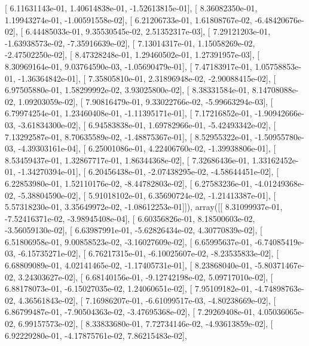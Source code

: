 \documentclass{article}
\begin{document}
       [  6.11631143e-01,   1.40614838e-01,  -1.52613815e-01],
       [  8.36082350e-01,   1.19943274e-01,  -1.00591558e-02],
       [  6.21206733e-01,   1.61808767e-02,  -6.48420676e-02],
       [  6.44485033e-01,   9.35530545e-02,   2.51352317e-03],
       [  7.29121203e-01,  -1.63938573e-02,  -7.35916639e-02],
       [  7.13014317e-01,   1.15058269e-02,  -2.47502250e-02],
       [  8.47328248e-01,   1.29460502e-01,   1.27391957e-03],
       [  8.30969164e-01,   9.03764590e-03,  -1.05690479e-01],
       [  7.47183917e-01,   1.05758853e-01,  -1.36364842e-01],
       [  7.35805810e-01,   2.31896948e-02,  -2.90088415e-02],
       [  6.97505880e-01,   1.58299992e-02,   3.93025800e-02],
       [  8.38331584e-01,   8.14708088e-02,   1.09203059e-02],
       [  7.90816479e-01,   9.33022766e-02,  -5.99663294e-03],
       [  6.79974254e-01,   1.23460408e-01,  -1.11395171e-01],
       [  7.17216852e-01,  -1.90942666e-03,  -3.61834300e-02],
       [  6.94583838e-01,   1.69782966e-01,  -5.42493342e-02],
       [  7.13292587e-01,   8.70635589e-02,  -1.48875367e-01],
       [  8.52955322e-01,  -1.50955780e-03,  -4.39303161e-04],
       [  6.25001086e-01,   4.22406760e-02,  -1.39938806e-01],
       [  8.53459437e-01,   1.32867717e-01,   1.86344368e-02],
       [  7.32686436e-01,   1.33162452e-01,  -1.34270394e-01],
       [  6.20456438e-01,  -2.07438295e-02,  -4.58644451e-02],
       [  6.22853980e-01,   1.52110176e-02,  -8.44782803e-02],
       [  6.27583236e-01,  -4.01249368e-02,  -5.38804590e-02],
       [  5.91018102e-01,   6.35690724e-02,  -1.21413387e-01],
       [  5.57318230e-01,   3.35649972e-02,  -1.08612253e-01]]), array([[  8.31099937e-01,  -7.52416371e-02,  -3.98945408e-04],
       [  6.60356826e-01,   8.18500603e-02,  -3.56059130e-02],
       [  6.63987991e-01,  -5.62826434e-02,   4.30770839e-02],
       [  6.51806958e-01,   9.00858523e-02,  -3.16027609e-02],
       [  6.65995637e-01,  -6.74085419e-03,  -6.15735271e-02],
       [  6.76217315e-01,  -6.10025607e-02,  -8.23535833e-02],
       [  6.68809089e-01,   4.02141465e-02,  -1.17405731e-01],
       [  8.23868040e-01,  -5.80371467e-02,   3.24303627e-02],
       [  6.68140156e-01,  -9.12742198e-02,   5.09717010e-02],
       [  6.88178073e-01,  -6.15027035e-02,   1.24060651e-02],
       [  7.95109182e-01,  -4.74898763e-02,   4.36561843e-02],
       [  7.16986207e-01,  -6.61099517e-03,  -4.80238669e-02],
       [  6.86799487e-01,  -7.90504363e-02,  -3.47695368e-02],
       [  7.29269408e-01,   4.05036065e-02,   6.99157573e-02],
       [  8.33833680e-01,   7.72734146e-02,  -4.93613859e-02],
       [  6.92229280e-01,  -4.17875761e-02,   7.86215483e-02],
\end{document}
